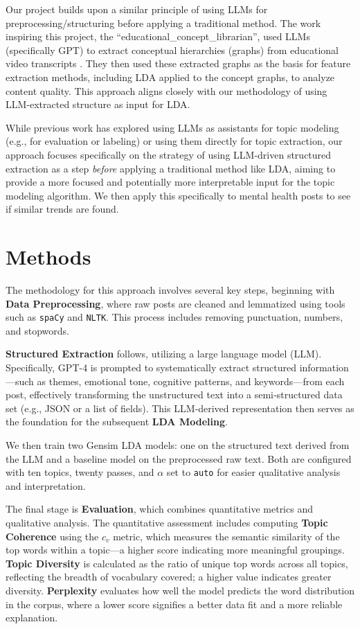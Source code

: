 \documentclass{article}
\begin{document}
Our project builds upon a similar principle of using LLMs for preprocessing/structuring before applying a traditional method. The work inspiring this project, the ``educational\_concept\_librarian'', used LLMs (specifically GPT) to extract conceptual hierarchies (graphs) from educational video transcripts \citep{HramirEduConceptLibrarian}. They then used these extracted graphs as the basis for feature extraction methods, including LDA applied to the concept graphs, to analyze content quality. This approach aligns closely with our methodology of using LLM-extracted structure as input for LDA.

While previous work has explored using LLMs as assistants for topic modeling (e.g., for evaluation or labeling) or using them directly for topic extraction, our approach focuses specifically on the strategy of using LLM-driven structured extraction as a step \emph{before} applying a traditional method like LDA, aiming to provide a more focused and potentially more interpretable input for the topic modeling algorithm. We then apply this specifically to mental health posts to see if similar trends are found.

\section{Methods}

\noindent
The methodology for this approach involves several key steps, beginning with \textbf{Data Preprocessing}, where raw posts are cleaned and lemmatized using tools such as \texttt{spaCy} and \texttt{NLTK}. This process includes removing punctuation, numbers, and stopwords.

\textbf{Structured Extraction} follows, utilizing a large language model (LLM). Specifically, GPT-4 is prompted to systematically extract structured information—such as themes, emotional tone, cognitive patterns, and keywords—from each post, effectively transforming the unstructured text into a semi‑structured data set (e.g., JSON or a list of fields). This LLM‑derived representation then serves as the foundation for the subsequent \textbf{LDA Modeling}.

We then train two Gensim LDA models: one on the structured text derived from the LLM and a baseline model on the preprocessed raw text. Both are configured with ten topics, twenty passes, and $\alpha$ set to \texttt{auto} for easier qualitative analysis and interpretation.

The final stage is \textbf{Evaluation}, which combines quantitative metrics and qualitative analysis. The quantitative assessment includes computing \textbf{Topic Coherence} using the $c_v$ metric, which measures the semantic similarity of the top words within a topic—a higher score indicating more meaningful groupings. \textbf{Topic Diversity} is calculated as the ratio of unique top words across all topics, reflecting the breadth of vocabulary covered; a higher value indicates greater diversity. \textbf{Perplexity} evaluates how well the model predicts the word distribution in the corpus, where a lower score signifies a better data fit and a more reliable explanation.
\end{document}
